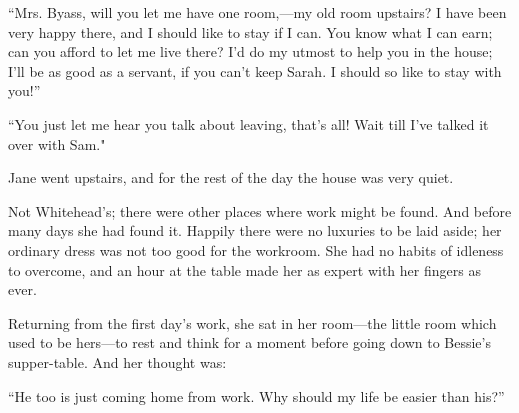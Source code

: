 ``Mrs. Byass, will you let me have one room,---my old room upstairs? I
have been very happy there, and I should like to stay if I can. You know
what I can earn; can you afford to let me live there? I'd do my utmost
to help you in the house; I'll be as good as a servant, if you can't
keep Sarah. I should so like to stay with you!''

``You just let me hear you talk about {}leaving, that's all! Wait till
I've talked it over with Sam."

Jane went upstairs, and for the rest of the day the house was very
quiet.

Not Whitehead's; there were other places where work might be found. And
before many days she had found it. Happily there were no luxuries to be
laid aside; her ordinary dress was not too good for the workroom. She
had no habits of idleness to overcome, and an hour at the table made her
as expert with her fingers as ever.

Returning from the first day's work, she sat in her room---the little
room which used to be hers---to rest and think for a moment before going
down to Bessie's supper-table. And her thought was:

``He too is just coming home from work. Why should my life be easier
than his?''
